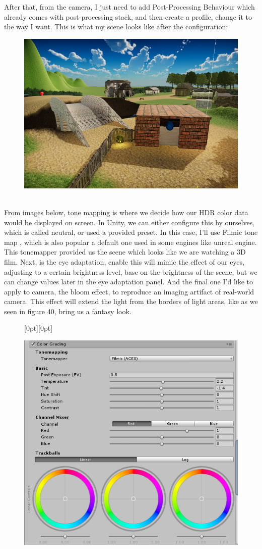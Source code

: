 \documentclass[a4paper, 13pt]{extarticle}
\begin{document}
{After that, from the camera, I just need to add Post-Processing Behaviour which already comes with post-processing stack, and then create a profile, change it to the way I want. This is what my scene looks like after the configuration:
\begin{figure}[h] 
	\begin{minipage}{1\textwidth}
		\centering
		\includegraphics[width=0.45\linewidth]{intructions/3d_film.png}
		\centering
		\label{fig:test35}
	\end{minipage}      	
\end{figure} \\
From images below, tone mapping is where we decide how our HDR color data would be displayed on screen. In Unity, we can either configure this by ourselves, which is called neutral, or used a provided preset. In this case, I'll use Filmic tone map , which is also popular a default one used in some engines like unreal engine. This tonemapper provided us the scene which looks like we are watching a 3D film. Next, is the eye adaptation, enable this will mimic the effect of our eyes, adjusting to a certain brightness level, base on the brightness of the scene, but we can change values later in the eye adaptation panel. And the final one I'd like to apply to camera, the bloom effect, to reproduce an imaging artifact of real-world camera. This effect will extend the light from the borders of light areas, like as we seen in figure 40, bring us a fantasy look.  
\begin{figure}[h] 
\raisebox{-32mm}[0pt][0pt]{
 	\begin{minipage}{0.45\textwidth}
 		\centering
 		\includegraphics[width=0.8\linewidth]{intructions/Tone_mapper.png}

\end{minipage}}
\end{figure}}
\end{document}
